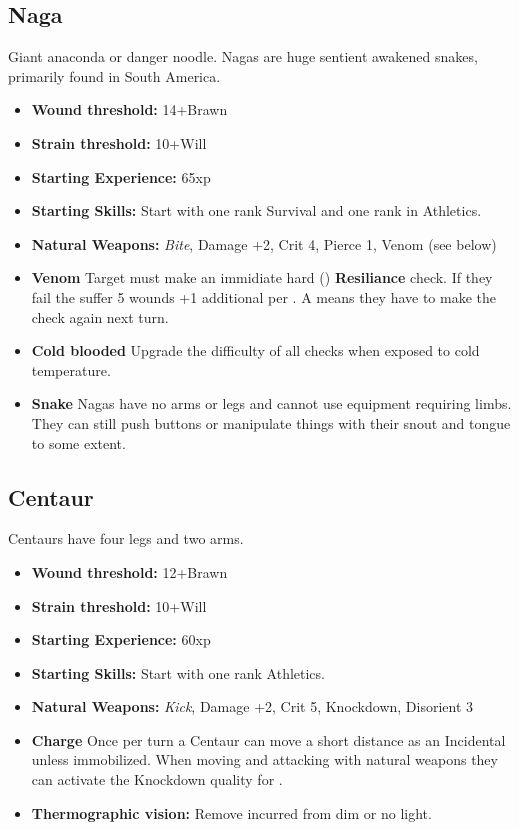 \documentclass{book}
\begin{document}
\begin{multicols}{2}
	\subsection{Naga}
	Giant anaconda or danger noodle. Nagas are huge sentient awakened snakes, primarily found in South America.
	
	\begin{itemize}
		\item \textbf{Wound threshold:} 14+Brawn
		\item \textbf{Strain threshold:} 10+Will
		\item \textbf{Starting Experience:} 65xp
		\item \textbf{Starting Skills:} Start with one rank Survival and one rank in Athletics.
		\item \textbf{Natural Weapons:} \textit{Bite}, Damage +2, Crit 4, Pierce 1, Venom (see below)
		\item \textbf{Venom} Target must make an immidiate hard (\DifficultyDie \DifficultyDie \DifficultyDie) \textbf{Resiliance} check. If they fail the suffer 5 wounds +1 additional per \Threat. A \Despair means they have to make the check again next turn.
		\item \textbf{Cold blooded} Upgrade the difficulty of all checks when exposed to cold temperature.
		\item \textbf{Snake} Nagas have no arms or legs and cannot use equipment requiring limbs. They can still push buttons or manipulate things with their snout and tongue to some extent.
	\end{itemize}
	
	
	\subsection{Centaur}
	Centaurs have four legs and two arms.
	
	\begin{itemize}
		\item \textbf{Wound threshold:} 12+Brawn
		\item \textbf{Strain threshold:} 10+Will
		\item \textbf{Starting Experience:} 60xp
		\item \textbf{Starting Skills:} Start with one rank Athletics.
		\item \textbf{Natural Weapons:} \textit{Kick}, Damage +2, Crit 5, Knockdown, Disorient 3
		\item \textbf{Charge} Once per turn a Centaur can move a short distance as an Incidental unless immobilized. When moving and attacking with natural weapons they can activate the Knockdown quality for \Advantage.
		\item \textbf{Thermographic vision:} Remove \SetbackDie \SetbackDie incurred from dim or no light.
	\end{itemize}
\end{multicols}
\end{document}
